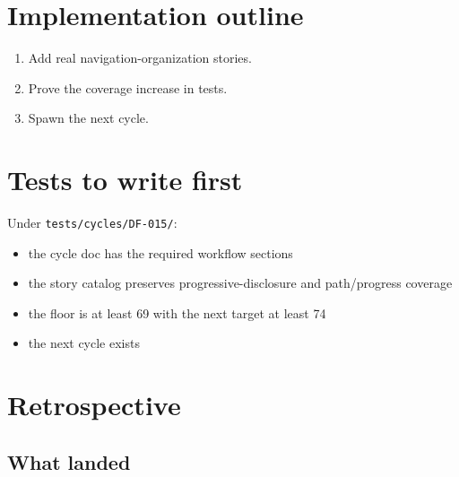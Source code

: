 \section{Implementation outline}\label{record-077-implementation-outline}

\begin{enumerate}
\def\labelenumi{\arabic{enumi}.}
\tightlist
\item
  Add real navigation-organization stories.
\item
  Prove the coverage increase in tests.
\item
  Spawn the next cycle.
\end{enumerate}

\section{Tests to write first}\label{record-077-tests-to-write-first}

Under \texttt{t\allowbreak{}e\allowbreak{}s\allowbreak{}t\allowbreak{}s\allowbreak{}/\allowbreak{}c\allowbreak{}y\allowbreak{}c\allowbreak{}l\allowbreak{}e\allowbreak{}s\allowbreak{}/\allowbreak{}D\allowbreak{}F\allowbreak{}-\allowbreak{}0\allowbreak{}1\allowbreak{}5\allowbreak{}/}:

\begin{itemize}
\tightlist
\item
  the cycle doc has the required workflow sections
\item
  the story catalog preserves progressive-disclosure and path/progress coverage
\item
  the floor is at least 69 with the next target at least 74
\item
  the next cycle exists
\end{itemize}

\section{Retrospective}\label{record-077-retrospective}

\subsection{What landed}\label{record-077-what-landed}

